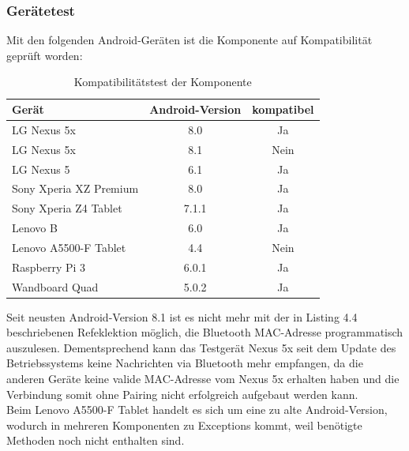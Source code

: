 \subsubsection{Gerätetest}
Mit den folgenden Android-Geräten ist die Komponente auf Kompatibilität geprüft worden:
\begin{table}[H]
	\begin{center}
		\caption{Kompatibilitätstest der Komponente}
		\label{tab:dimensions}
		\begin{tabular}{l|c|c} 			
			Gerät & Android-Version & kompatibel \\
			\hline
			LG Nexus 5x & 8.0 & Ja\\
			LG Nexus 5x & 8.1 & Nein\\
			LG Nexus 5 & 6.1 & Ja\\
			Sony Xperia XZ Premium & 8.0 & Ja\\
			Sony Xperia Z4 Tablet & 7.1.1 & Ja\\
			Lenovo B & 6.0 & Ja\\
			Lenovo A5500-F Tablet & 4.4 & Nein\\
			Raspberry Pi 3 & 6.0.1 & Ja\\	
			Wandboard Quad & 5.0.2 & Ja\\			
		\end{tabular}
	\end{center}
\end{table}
Seit neusten Android-Version 8.1 ist es nicht mehr mit der in Listing 4.4 beschriebenen Refeklektion möglich, die Bluetooth MAC-Adresse programmatisch auszulesen. Dementsprechend kann das Testgerät Nexus 5x seit dem Update des Betriebssystems keine Nachrichten via Bluetooth mehr empfangen, da die anderen Geräte keine valide MAC-Adresse vom Nexus 5x erhalten haben und die Verbindung somit ohne Pairing nicht erfolgreich aufgebaut werden kann. 
\\Beim Lenovo A5500-F Tablet handelt es sich um eine zu alte Android-Version, wodurch in mehreren Komponenten zu Exceptions kommt, weil benötigte Methoden noch nicht enthalten sind.



